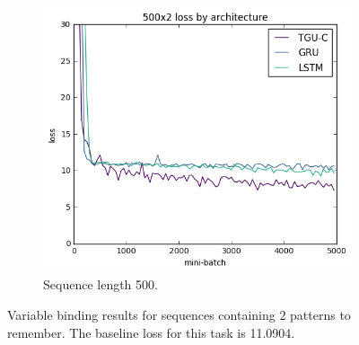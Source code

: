 \begin{figure}[p]
\begin{subfigure}[t]{0.3\linewidth}
	\includegraphics[width=\linewidth]{exps/vbind/plots/500x2}
	\caption{Sequence length 500.}
\end{subfigure}

\caption[Variable binding results, two patterns]
{Variable binding results for sequences containing \(2\) patterns to remember. The baseline loss for this
task is 11.0904.}
\label{fig:vbindn2}
\end{figure}

